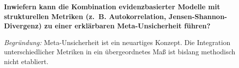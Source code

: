 \textbf{Inwiefern kann die Kombination evidenzbasierter Modelle mit strukturellen Metriken (z.~B. Autokorrelation, Jensen-Shannon-Divergenz) zu einer erklärbaren Meta-Unsicherheit führen?}

\emph{Begründung:} Meta-Unsicherheit ist ein neuartiges Konzept. Die Integration unterschiedlicher Metriken in ein übergeordnetes Maß ist bislang methodisch nicht etabliert.

\vspace{2em}


